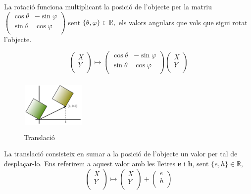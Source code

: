 \documentclass[12pt]{report}
\begin{document}
La rotació funciona multiplicant la posició de l'objecte per la matriu
$\begin{pmatrix}
\cos{\theta} & -\sin{\varphi}\\
\sin{\theta} & \cos{\varphi}\\
\end{pmatrix} $
sent $\{\theta, \varphi\} \in \mathbb{R},$ 
 els valors angulars que vols que sigui rotat l'objecte.
\newline


$$\begin{pmatrix}
X \\
Y \\
\end{pmatrix}
\mapsto
\begin{pmatrix}
\cos{\theta} & -\sin{\varphi}\\
\sin{\theta} & \cos{\varphi}\\
\end{pmatrix} 
\begin{pmatrix}
X \\
Y \\
\end{pmatrix}
$$
\newline
\newline

\begin{figure}
\includegraphics[width=0.3\textwidth]{traslacion.jpg}
\caption{Translació}
\end{figure}
 La translació consisteix en sumar a la posició de l'objecte un
valor per tal de desplaçar-lo. Ens referirem a aquest valor amb les lletres \textbf{e} i \textbf{h}, sent $\{e, h\} \in \mathbb{R},$ 
\newline
\newline
$$
\begin{pmatrix}
X \\
Y \\
\end{pmatrix}
\mapsto
\begin{pmatrix}
X\\
Y\\
\end{pmatrix} 
+
\begin{pmatrix}
e\\
h\\
\end{pmatrix} 
$$
\newline
\end{document}
